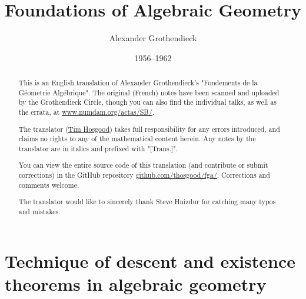 \documentclass[a4paper,oneside,fleqn]{book}
\title{Foundations of Algebraic Geometry}
\author{Alexander Grothendieck}
\date{1956--1962}
\begin{document}
\frontmatter
\pagestyle{plain}
\maketitle

\begin{abstract}
  This is an English translation of {Alexander Grothendieck}'s "Fondements de la Géometrie Algébrique".
  The original (French) notes have been scanned and uploaded by the Grothendieck Circle, though you can also find the individual talks, as well as the errata, at \url{www.numdam.org/actas/SB/}.

  The translator (\href{https://thosgood.com}{Tim Hosgood}) takes full responsibility for any errors introduced, and claims no rights to any of the mathematical content herein.
  Any notes by the translator are in italics and prefixed with "[Trans.]".

  You can view the entire source code of this translation (and contribute or submit corrections) in the GitHub repository \url{github.com/thosgood/fga/}.
  Corrections and comments welcome.

  The translator would like to sincerely thank Steve Hnizdur for catching many typos and mistakes.
\end{abstract}

\setcounter{tocdepth}{1}
\tableofcontents

\mainmatter
\pagestyle{fancy}

\setcounter{part}{-1}
\renewcommand\thepart{}


\renewcommand\thepart{\arabic{part}}


\setcounter{chapter}{0}


\part{Technique of descent and existence theorems in algebraic geometry}
\setcounter{part}{0}
\renewcommand\thepart{3.\Roman{part}}

\setcounter{chapter}{0}
\renewcommand\thechapter{\Alph{chapter}}
\renewcommand\thesubsection{\alph{subsection}}


\setcounter{chapter}{0}


\setcounter{chapter}{-1}
\renewcommand\thechapter{\arabic{chapter}}


\setcounter{chapter}{-1}


\setcounter{chapter}{0}


\setcounter{chapter}{-1}


\backmatter
\nocite{*}
\pagestyle{plain}
\printbibliography[heading=bibintoc,title=Bibliography]
\end{document}
